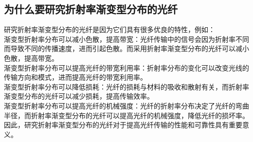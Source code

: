 \documentclass[12pt, a4paper, oneside]{article}
\begin{document}
\begin{spacing}{2.0}
\section{为什么要研究折射率渐变型分布的光纤}
研究折射率渐变型分布的光纤是因为它们具有很多优良的特性，例如：
\\
渐变型折射率分布可以减小色散，提高带宽：光纤传输中的信号会因为折射率不同而导致不同的传播速度，进而引起色散。而采用折射率渐变型分布的光纤可以减小色散，提高带宽。
\\
渐变型折射率分布可以提高光纤的带宽利用率：折射率分布的变化可以改变光线的传输方向和模式，进而提高光纤的带宽利用率。
\\
渐变型折射率分布可以降低损耗：光纤的损耗与材料的吸收和散射有关，而折射率渐变型分布的光纤可以减少损耗，提高传输效率。
\\
渐变型折射率分布可以提高光纤的机械强度：光纤的折射率分布决定了光纤的弯曲半径，而折射率渐变型分布的光纤可以提高光纤的机械强度，降低光纤的损坏率。
\\
因此，研究折射率渐变型分布的光纤对于提高光纤传输的性能和可靠性具有重要意义。






\end{spacing}{}
\end{document}
